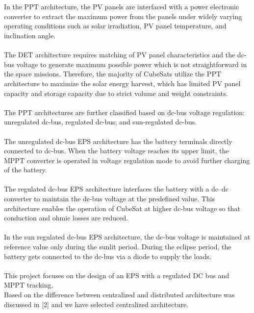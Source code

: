 \\ \\
 In the PPT architecture, the PV panels are interfaced with a power electronic converter to extract the maximum power from the panels under widely varying operating conditions such as solar irradiation, PV panel temperature, and inclination angle. 
 \\ \\
The DET architecture requires matching of PV panel characteristics and the dc-bus voltage to generate maximum possible power which is not straightforward in the space missions. Therefore, the majority of CubeSats utilize the PPT architecture to maximize the solar energy harvest, which has limited PV panel capacity and storage capacity due to strict volume and weight constraints. 
\\ \\
The PPT architectures are further classified based on dc-bus voltage regulation: unregulated dc-bus, regulated dc-bus; and sun-regulated dc-bus. 
\\ \\
The unregulated dc-bus EPS architecture has the battery terminals directly connected to dc-bus. When the battery voltage reaches its upper limit, the MPPT converter is operated in voltage regulation mode to avoid further charging of the battery. 
\\ \\
The regulated dc-bus EPS architecture interfaces the battery with a dc–dc converter to maintain the dc-bus voltage at the predefined value. This architecture enables the operation of CubeSat at higher dc-bus voltage so that conduction and ohmic losses are reduced. 
\\ \\
In the sun regulated dc-bus EPS architecture, the dc-bus voltage is maintained at reference value only during the sunlit period. During the eclipse period, the battery gets connected to the dc-bus via a diode to supply the loads.
\\ \\

 This project focuses on the design of an EPS with a regulated DC bus and MPPT tracking.
%
\\

Based on the difference between centralized and distributed architecture was discussed in [2] and we have selected centralized architecture.
\\

